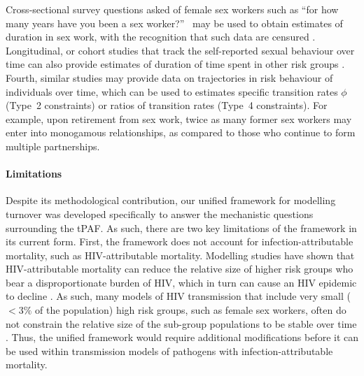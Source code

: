 Cross-sectional survey questions asked of female sex workers such as
``for how many years have you been a sex worker?''\ %
may be used to obtain estimates of duration in sex work,
with the recognition that such data are censured \citep{Watts2010}.
Longitudinal, or cohort studies
that track the self-reported sexual behaviour over time can also provide 
estimates of duration of time spent in other risk groups \citep{Fergus2007}.
Fourth, similar studies may provide data on
trajectories in risk behaviour of individuals over time,
which can be used to estimates specific transition rates $\phi$ (Type~2 constraints)
or ratios of transition rates (Type~4 constraints).
For example, upon retirement from sex work,
twice as many former sex workers may enter into monogamous relationships,
as compared to those who continue to form multiple partnerships.
\paragraph{Limitations}
Despite its methodological contribution, our unified 
framework for modelling turnover was developed specifically 
to answer the mechanistic questions surrounding the tPAF. 
As such, there are two key limitations of the framework in its current form.
First, the framework does not account for						%
infection-attributable mortality, such as HIV-attributable mortality.
Modelling studies have shown that HIV-attributable mortality can reduce the 
relative size of higher risk groups who bear a disproportionate burden of HIV, which in turn 
can cause an HIV epidemic to decline \citep{Boily1997}.
As such, many models of HIV transmission
that include very small ($<3\%$ of the population)
high risk groups, such as female sex workers,
often do not constrain the relative size
of the sub-group populations to be stable over time
\citep{Pickles2013}. Thus, the unified framework would require 
additional modifications before it can be used within transmission models of 
pathogens with infection-attributable mortality.									



